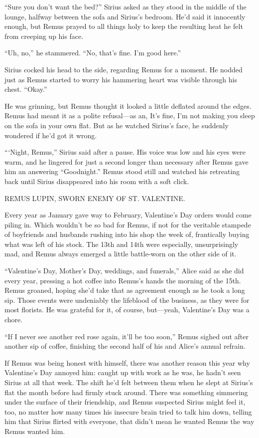 “Sure you don’t want the bed?” Sirius asked as they stood in the middle of the lounge, halfway between the sofa and Sirius’s bedroom. He’d said it innocently enough, but Remus prayed to all things holy to keep the resulting heat he felt from creeping up his face.

“Uh, no,” he stammered. “No, that’s fine. I’m good here.”

Sirius cocked his head to the side, regarding Remus for a moment. He nodded just as Remus started to worry his hammering heart was visible through his chest. “Okay.”

He was grinning, but Remus thought it looked a little deflated around the edges. Remus had meant it as a polite refusal—as an, It’s fine, I’m not making you sleep on the sofa in your own flat. But as he watched Sirius’s face, he suddenly wondered if he’d got it wrong.

“‘Night, Remus,” Sirius said after a pause. His voice was low and his eyes were warm, and he lingered for just a second longer than necessary after Remus gave him an answering “Goodnight.” Remus stood still and watched his retreating back until Sirius disappeared into his room with a soft click.


\newpage


REMUS LUPIN, SWORN ENEMY OF ST. VALENTINE.

Every year as January gave way to February, Valentine’s Day orders would come piling in. Which wouldn’t be so bad for Remus, if not for the veritable stampede of boyfriends and husbands rushing into his shop the week of, frantically buying what was left of his stock. The 13th and 14th were especially, unsurprisingly mad, and Remus always emerged a little battle-worn on the other side of it.

“Valentine’s Day, Mother’s Day, weddings, and funerals,” Alice said as she did every year, pressing a hot coffee into Remus’s hands the morning of the 15th. Remus groaned, hoping she’d take that as agreement enough as he took a long sip. Those events were undeniably the lifeblood of the business, as they were for most florists. He was grateful for it, of course, but—yeah, Valentine’s Day was a chore.

“If I never see another red rose again, it’ll be too soon,” Remus sighed out after another sip of coffee, finishing the second half of his and Alice’s annual refrain.

If Remus was being honest with himself, there was another reason this year why Valentine’s Day annoyed him: caught up with work as he was, he hadn’t seen Sirius at all that week. The shift he’d felt between them when he slept at Sirius’s flat the month before had firmly stuck around. There was something simmering under the surface of their friendship, and Remus suspected Sirius might feel it, too, no matter how many times his insecure brain tried to talk him down, telling him that Sirius flirted with everyone, that didn’t mean he wanted Remus the way Remus wanted him.

